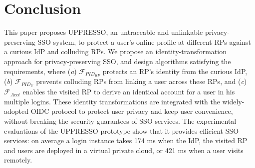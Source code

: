 \section{Conclusion}
\label{sec:conclusion}
This paper proposes UPPRESSO, an untraceable and unlinkable privacy-preserving SSO system,
 to protect a user's online profile at different RPs against a curious IdP and colluding RPs.
We propose an identity-transformation approach for privacy-preserving SSO,
 and design algorithms satisfying the requirements,
 where (\emph{a}) $\mathcal{F}_{PID_{RP}}$ protects an RP's identity from the curious IdP,
(\emph{b})  $\mathcal{F}_{PID_{U}}$ prevents colluding RPs from linking a user across these RPs,
 and (\emph{c}) $\mathcal{F}_{Acct}$ enables the visited RP to derive an identical account for a user in his multiple logins.
These identity transformations are integrated with the widely-adopted OIDC protocol
    to protect user privacy and keep user convenience,
    without breaking the security guarantees of SSO services.
The experimental evaluations of the UPPRESSO prototype show
 that it provides efficient SSO services:
  on average a login instance takes 174 ms when the IdP, the visited RP and users are deployed in a virtual private cloud, or 421 ms when a user visits remotely.

